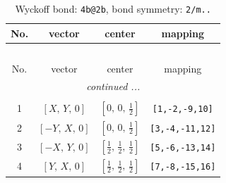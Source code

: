 \documentclass[fleqn,8pt]{jsarticle}
\begin{document}
\renewcommand{\arraystretch}{1.2}
\begin{longtable}{cccc}
\caption{Wyckoff bond: {\tt 4b@2b}, bond symmetry: {\tt 2/m..}}
 \\
 \hline \hline
No. & vector & center & mapping \\ \hline \endfirsthead

\multicolumn{3}{l}{\tablename\ \thetable{}} \\
 \hline \hline
No. & vector & center & mapping \\ \hline \endhead

 \hline \hline
\multicolumn{3}{r}{\footnotesize\it continued ...} \\ \endfoot

 \hline \hline
\multicolumn{3}{r}{} \\ \endlastfoot

1 & $\left[ X,\, Y,\, 0 \right]$ & $\left[ 0,\, 0,\, \frac{1}{2} \right]$ & {\tt [1,-2,-9,10]} \\ \hline
2 & $\left[ - Y,\, X,\, 0 \right]$ & $\left[ 0,\, 0,\, \frac{1}{2} \right]$ & {\tt [3,-4,-11,12]} \\ \hline
3 & $\left[ - X,\, Y,\, 0 \right]$ & $\left[ \frac{1}{2},\, \frac{1}{2},\, \frac{1}{2} \right]$ & {\tt [5,-6,-13,14]} \\ \hline
4 & $\left[ Y,\, X,\, 0 \right]$ & $\left[ \frac{1}{2},\, \frac{1}{2},\, \frac{1}{2} \right]$ & {\tt [7,-8,-15,16]} \\
\end{longtable}
\renewcommand{\arraystretch}{1.2}
\end{document}
